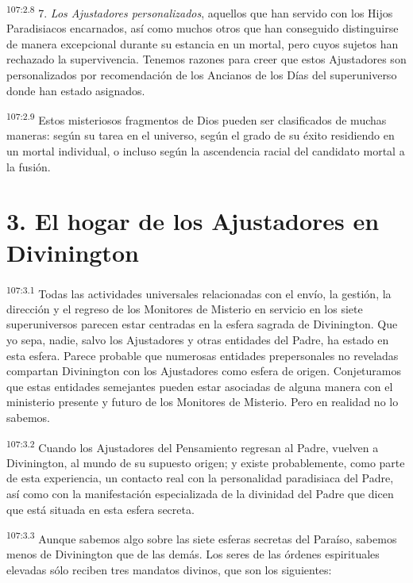 \par
\textsuperscript{107:2.8} 7. \textit{Los Ajustadores personalizados}, aquellos que han servido con los Hijos Paradisiacos encarnados, así como muchos otros que han conseguido distinguirse de manera excepcional durante su estancia en un mortal, pero cuyos sujetos han rechazado la supervivencia. Tenemos razones para creer que estos Ajustadores son personalizados por recomendación de los Ancianos de los Días del superuniverso donde han estado asignados.

\par
\textsuperscript{107:2.9} Estos misteriosos fragmentos de Dios pueden ser clasificados de muchas maneras: según su tarea en el universo, según el grado de su éxito residiendo en un mortal individual, o incluso según la ascendencia racial del candidato mortal a la fusión.

\section*{3. El hogar de los Ajustadores en Divinington}
\par
\textsuperscript{107:3.1} Todas las actividades universales relacionadas con el envío, la gestión, la dirección y el regreso de los Monitores de Misterio en servicio en los siete superuniversos parecen estar centradas en la esfera sagrada de Divinington. Que yo sepa, nadie, salvo los Ajustadores y otras entidades del Padre, ha estado en esta esfera. Parece probable que numerosas entidades prepersonales no reveladas compartan Divinington con los Ajustadores como esfera de origen. Conjeturamos que estas entidades semejantes pueden estar asociadas de alguna manera con el ministerio presente y futuro de los Monitores de Misterio. Pero en realidad no lo sabemos.

\par
\textsuperscript{107:3.2} Cuando los Ajustadores del Pensamiento regresan al Padre, vuelven a Divinington, al mundo de su supuesto origen; y existe probablemente, como parte de esta experiencia, un contacto real con la personalidad paradisiaca del Padre, así como con la manifestación especializada de la divinidad del Padre que dicen que está situada en esta esfera secreta.

\par
\textsuperscript{107:3.3} Aunque sabemos algo sobre las siete esferas secretas del Paraíso, sabemos menos de Divinington que de las demás. Los seres de las órdenes espirituales elevadas sólo reciben tres mandatos divinos, que son los siguientes:

